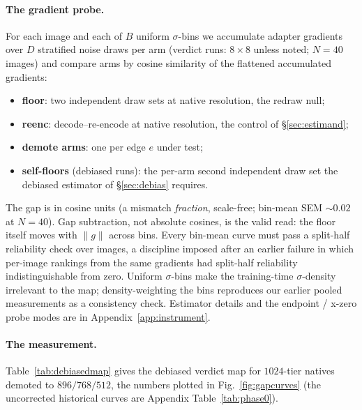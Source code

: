 \paragraph{The gradient probe.}
For each image and each of $B$ uniform $\sigma$-bins we accumulate adapter
gradients over $D$ stratified noise draws per arm (verdict runs:
$8 \times 8$ unless noted; $N = 40$ images) and compare arms by cosine
similarity of the flattened accumulated gradients:
\begin{itemize}
\item \textbf{floor}: two independent draw sets at native resolution,
the redraw null;
\item \textbf{reenc}: decode--re-encode at native resolution, the
control of \S\ref{sec:estimand};
\item \textbf{demote arms}: one per edge $e$ under test;
\item \textbf{self-floors} (debiased runs): the per-arm second
independent draw set the debiased estimator of \S\ref{sec:debias}
requires.
\end{itemize}
The gap is in cosine units (a mismatch \emph{fraction}, scale-free;
bin-mean SEM ${\sim}0.02$ at $N{=}40$). Gap subtraction, not absolute
cosines, is the valid read: the floor itself moves with $\|g\|$ across
bins. Every bin-mean curve must pass a split-half reliability check over
images, a discipline imposed after an earlier failure in which
per-image rankings from the same gradients had split-half reliability
indistinguishable from zero. Uniform $\sigma$-bins make the
training-time $\sigma$-density irrelevant to the map; density-weighting
the bins reproduces our earlier pooled measurements as a consistency
check. Estimator details and the endpoint / x-zero probe modes are in
Appendix~\ref{app:instrument}.

\paragraph{The measurement.}
Table~\ref{tab:debiasedmap} gives the debiased verdict map for
$1024$-tier natives demoted to $896/768/512$, the numbers plotted in
Fig.~\ref{fig:gapcurves} (the uncorrected historical
curves are Appendix Table~\ref{tab:phase0}).

